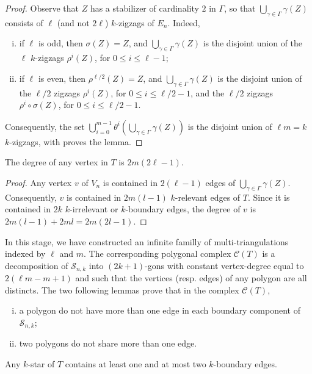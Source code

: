 \documentclass[12pt]{amsart}
\begin{document}
\begin{proof}
Observe that $Z$ has a stabilizer of cardinality $2$ in $\Gamma$, so that $\bigcup_{\gamma\in\Gamma} \gamma(Z)$ consists of $\ell$ (and not $2\ell$) $k$-zigzags of $E_n$. Indeed,
\begin{enumerate}[(i)]
\item if $\ell$ is odd, then $\sigma(Z)=Z$, and $\bigcup_{\gamma\in\Gamma} \gamma(Z)$ is the disjoint union of the $\ell$ $k$-zigzags $\rho^i(Z)$, for $0\le i\le \ell-1$;
\item if $\ell$ is even, then $\rho^{\ell/2}(Z)=Z$, and $\bigcup_{\gamma\in\Gamma} \gamma(Z)$ is the disjoint union of the $\ell/2$ zigzags $\rho^i(Z)$, for $0\le i\le \ell/2-1$, and the $\ell/2$ zigzags $\rho^i\circ\sigma(Z)$, for $0\le i\le \ell/2-1$.
\end{enumerate}
Consequently, the set $\bigcup_{i=0}^{m-1} \theta^i\left(\bigcup_{\gamma\in\Gamma} \gamma(Z)\right)$ is the disjoint union of $\ell m=k$ $k$-zigzags, with proves the lemma.
\end{proof}

\begin{lemma}\label{A}
The degree of any vertex in $T$ is $2m(2\ell-1)$.
\end{lemma}

\begin{proof}
Any vertex $v$ of $V_n$ is contained in $2(\ell-1)$ edges of $\bigcup_{\gamma\in\Gamma} \gamma(Z)$. Consequently, $v$ is contained in $2m(l-1)$ $k$-relevant edges of $T$. Since it is contained in $2k$ $k$-irrelevant or $k$-boundary edges, the degree of $v$ is $2m(l-1)+2ml=2m(2l-1)$.
\end{proof}

In this stage, we have constructed an infinite familly of multi-triangulations indexed by $\ell$ and $m$. The corresponding polygonal complex $\mathcal{C}(T)$ is a decomposition of $\mathcal{S}_{n,k}$ into $(2k+1)$-gons with constant vertex-degree equal to $2(\ell m-m+1)$ and such that the vertices (resp. edges) of any polygon are all distincts. The two following lemmas prove that in the complex $\mathcal{C}(T)$,
\begin{enumerate}[(i)]
\item a polygon do not have more than one edge in each boundary component of $\mathcal{S}_{n,k}$;
\item two polygons do not share more than one edge.
\end{enumerate}

\begin{lemma}\label{B}
Any $k$-star of $T$ contains at least one and at most two $k$-boundary edges.
\end{lemma}
\end{document}
